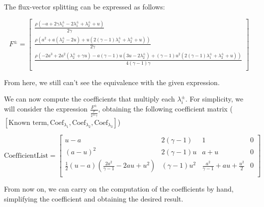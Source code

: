 The flux-vector splitting can be expressed as follows:

\begin{equation}
    F^\pm = \begin{bmatrix}
        \frac{\rho  (-a+2 \gamma  \lambda_1^\pm-2 \lambda_1^\pm+\lambda_2^\pm+u)}{2 \gamma }                                                                                                        \\
        \frac{\rho  \left(a^2+a (\lambda_2^\pm-2 u)+u (2 (\gamma -1) \lambda_1^\pm+\lambda_2^\pm+u)\right)}{2 \gamma }                                                                              \\
        \frac{\rho  \left(-2 a^3+2 a^2 (\lambda_2^\pm+\gamma  u)-a (\gamma -1) u (3 u-2 \lambda_2^\pm)+(\gamma -1) u^2 (2 (\gamma -1) \lambda_1^\pm+\lambda_2^\pm+u)\right)}{4 (\gamma -1) \gamma } \\
    \end{bmatrix}
\end{equation}

From here, we still can't see the equivalence with the given expression.

We can now compute the coefficients that multiply each $\lambda_i^\pm$.
For simplicity, we will consider the expression $\frac{F^\pm}{\frac{\rho}{2*\gamma}}$, obtaining the following coefficient matrix ($[\text{Known term}, \text{Coef}_{\lambda_1}, \text{Coef}_{\lambda_2}, \text{Coef}_{\lambda_3}]$)

\begin{equation}
    \text{CoefficientList} = \begin{bmatrix}
        u-a                                                   & 2 (\gamma -1)    & 1                                           & 0 \\
        (a-u)^2                                               & 2 (\gamma - 1) u & a+u                                         & 0 \\
        \frac{1}{2} (u-a) (\frac{2 a^2}{\gamma -1}-2 a u+u^2) & (\gamma -1) u^2  & \frac{a^2}{\gamma -1} + a u + \frac{u^2}{2} & 0 \\
    \end{bmatrix}
\end{equation}

From now on, we can carry on the computation of the coefficients by hand, simplifying the coefficient and obtaining the desired result.

